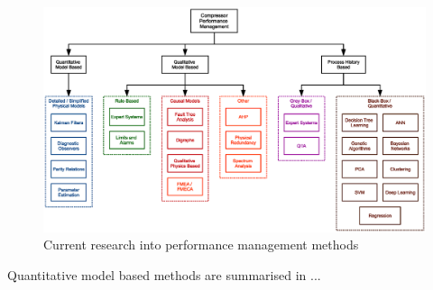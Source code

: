 \begin{figure}
\includegraphics[width=\textwidth]{./Images/perfmgmt.eps}
\caption{Current research into performance management methods}
\label{fig:perfmgmtmethods}
\end{figure}

Quantitative model based methods are summarised in ...

